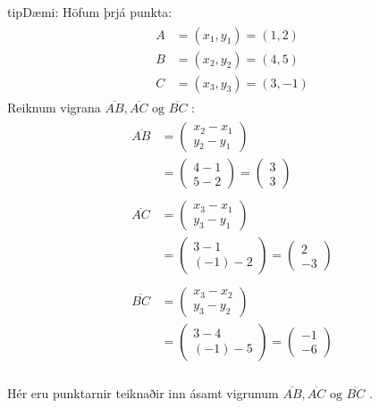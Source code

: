 \documentclass[a4paper,10pt,icelandic]{sphinxmanual}
\begin{document}
\begin{sphinxadmonition}{tip}{Dæmi:}
Höfum þrjá punkta:
\begin{equation*}
\begin{split}\begin{aligned}
A&=(x_1,y_1)=(1,2) \\
B&=(x_2,y_2)=(4,5) \\
C&=(x_3,y_3)=(3,-1)
\end{aligned}\end{split}
\end{equation*}
Reiknum vigrana \(\overline{AB}, \overline{AC} \text{ og } \overline{BC}\) :
\begin{equation*}
\begin{split}\begin{aligned}
  \overline{AB} &= \begin{pmatrix} x_2-x_1 \\ y_2-y_1 \end{pmatrix}\\
  &=\begin{pmatrix} 4-1 \\5-2\end{pmatrix} =\begin{pmatrix} 3 \\3\end{pmatrix} \\
  & \\
  \overline{AC} &= \begin{pmatrix}x_3-x_1\\ y_3-y_1 \end{pmatrix}\\
  &=\begin{pmatrix} 3-1 \\(-1)-2\end{pmatrix} =\begin{pmatrix} 2 \\-3\end{pmatrix} \\
  & \\
  \overline{BC} &= \begin{pmatrix}x_3-x_2\\ y_3-y_2 \end{pmatrix}\\
  &=\begin{pmatrix} 3-4 \\(-1)-5\end{pmatrix} =\begin{pmatrix} -1 \\-6\end{pmatrix} \\
\end{aligned}\end{split}
\end{equation*}
\begin{figure}[H]
\centering

\noindent{}
\end{figure}

Hér eru punktarnir teiknaðir inn ásamt vigrunum \(\overline{AB}, \overline{AC} \text{ og } \overline{BC}\) .
\end{sphinxadmonition}
\end{document}
